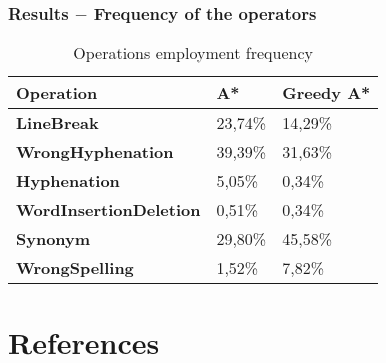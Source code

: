 \documentclass{beamer}
\begin{document}
\begin{frame}
\frametitle{Results $-$ Frequency of the operators}

\begin{small}
\begin{table}[h]
\centering
\begin{tabular}{l | l | l}
	\hline
	\textbf{Operation} &	\textbf{A*} &	\textbf{Greedy A*} \\ \hline
	\textbf{LineBreak} &	23,74\% &	14,29\% \\
	\textbf{WrongHyphenation} &	39,39\% &	31,63\% \\
	\textbf{Hyphenation} &	5,05\% &	0,34\% \\
	\textbf{WordInsertionDeletion} &	0,51\% &	0,34\% \\
	\textbf{Synonym} &	29,80\% &	45,58\% \\
	\textbf{WrongSpelling} &	1,52\% &	7,82\% \\
	\hline
\end{tabular}
\label{tab:operations_freq}
\caption{Operations employment frequency}
\end{table}
\end{small}

\end{frame}

\section{References}
\end{document}

